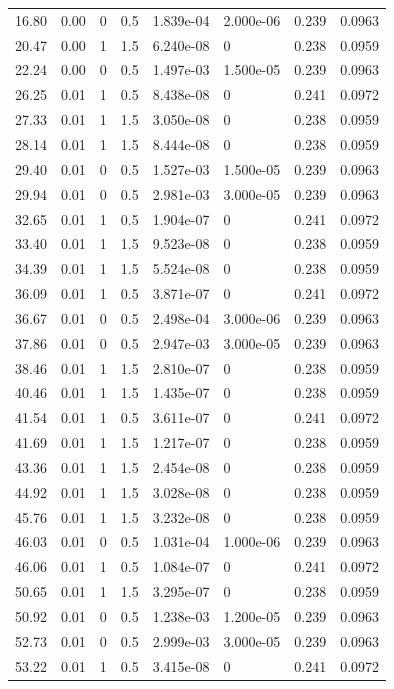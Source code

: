 \documentclass[preview]{standalone}
\begin{document}
{{\begin{tabular}{L{1.2cm}C{1.2cm} C{0.3cm}C{0.5cm} C{1.4cm}C{1.4cm} C{1.4cm}C{1.4cm}}
  16.80  &  0.00  & 0     & 0.5 &  1.839e-04  & 2.000e-06  & 0.239 &  0.0963   \\ 
  20.47  &  0.00  & 1     & 1.5 &  6.240e-08  & 0  & 0.238 &  0.0959   \\ 
  22.24  &  0.00  & 0     & 0.5 &  1.497e-03  & 1.500e-05  & 0.239 &  0.0963   \\ 
  26.25  &  0.01  & 1     & 0.5 &  8.438e-08  & 0  & 0.241 &  0.0972   \\ 
  27.33  &  0.01  & 1     & 1.5 &  3.050e-08  & 0  & 0.238 &  0.0959   \\ 
  28.14  &  0.01  & 1     & 1.5 &  8.444e-08  & 0  & 0.238 &  0.0959   \\ 
  29.40  &  0.01  & 0     & 0.5 &  1.527e-03  & 1.500e-05  & 0.239 &  0.0963   \\ 
  29.94  &  0.01  & 0     & 0.5 &  2.981e-03  & 3.000e-05  & 0.239 &  0.0963   \\ 
  32.65  &  0.01  & 1     & 0.5 &  1.904e-07  & 0  & 0.241 &  0.0972   \\ 
  33.40  &  0.01  & 1     & 1.5 &  9.523e-08  & 0  & 0.238 &  0.0959   \\ 
  34.39  &  0.01  & 1     & 1.5 &  5.524e-08  & 0  & 0.238 &  0.0959   \\ 
  36.09  &  0.01  & 1     & 0.5 &  3.871e-07  & 0  & 0.241 &  0.0972   \\ 
  36.67  &  0.01  & 0     & 0.5 &  2.498e-04  & 3.000e-06  & 0.239 &  0.0963   \\ 
  37.86  &  0.01  & 0     & 0.5 &  2.947e-03  & 3.000e-05  & 0.239 &  0.0963   \\ 
  38.46  &  0.01  & 1     & 1.5 &  2.810e-07  & 0  & 0.238 &  0.0959   \\ 
  40.46  &  0.01  & 1     & 1.5 &  1.435e-07  & 0  & 0.238 &  0.0959   \\ 
  41.54  &  0.01  & 1     & 0.5 &  3.611e-07  & 0  & 0.241 &  0.0972   \\ 
  41.69  &  0.01  & 1     & 1.5 &  1.217e-07  & 0  & 0.238 &  0.0959   \\ 
  43.36  &  0.01  & 1     & 1.5 &  2.454e-08  & 0  & 0.238 &  0.0959   \\ 
  44.92  &  0.01  & 1     & 1.5 &  3.028e-08  & 0  & 0.238 &  0.0959   \\ 
  45.76  &  0.01  & 1     & 1.5 &  3.232e-08  & 0  & 0.238 &  0.0959   \\ 
  46.03  &  0.01  & 0     & 0.5 &  1.031e-04  & 1.000e-06  & 0.239 &  0.0963   \\ 
  46.06  &  0.01  & 1     & 0.5 &  1.084e-07  & 0  & 0.241 &  0.0972   \\ 
  50.65  &  0.01  & 1     & 1.5 &  3.295e-07  & 0  & 0.238 &  0.0959   \\ 
  50.92  &  0.01  & 0     & 0.5 &  1.238e-03  & 1.200e-05  & 0.239 &  0.0963   \\ 
  52.73  &  0.01  & 0     & 0.5 &  2.999e-03  & 3.000e-05  & 0.239 &  0.0963   \\ 
  53.22  &  0.01  & 1     & 0.5 &  3.415e-08  & 0  & 0.241 &  0.0972   \\ 
\hline 
\end{tabular} 

}}
\end{document}
